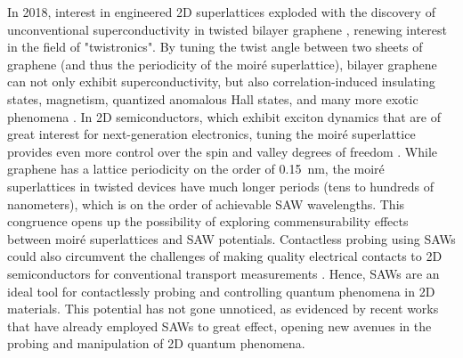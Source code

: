 \documentclass[double,12pt,1in,seploa]{beavtex}
\begin{document}
In 2018, interest in engineered 2D superlattices exploded with the discovery of unconventional superconductivity in twisted bilayer graphene \cite{cao_unconventional_2018}, renewing interest in the field of "twistronics". By tuning the twist angle between two sheets of graphene (and thus the periodicity of the moiré superlattice), bilayer graphene can not only exhibit superconductivity, but also correlation-induced insulating states, magnetism, quantized anomalous Hall states, and many more exotic phenomena \cite{andrei_graphene_2020}. In 2D semiconductors, which exhibit exciton dynamics that are of great interest for next-generation electronics, tuning the moiré superlattice provides even more control over the spin and valley degrees of freedom \cite{ciarrocchi_excitonic_2022}. While graphene has a lattice periodicity on the order of \SI{0.15}{\nano\meter}, the moiré superlattices in twisted devices have much longer periods (tens to hundreds of nanometers), which is on the order of achievable SAW wavelengths. This congruence opens up the possibility of exploring commensurability effects between moiré superlattices and SAW potentials. Contactless probing using SAWs could also circumvent the challenges of making quality electrical contacts to 2D semiconductors for conventional transport measurements \cite{miao_recent_2022}. Hence, SAWs are an ideal tool for contactlessly probing and controlling quantum phenomena in 2D materials. This potential has not gone unnoticed, as evidenced by recent works that have already employed SAWs to great effect, opening new avenues in the probing and manipulation of 2D quantum phenomena.
\end{document}
